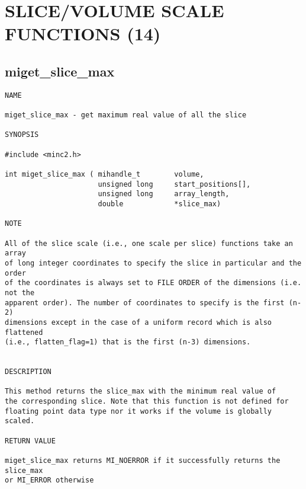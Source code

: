 \documentclass{article}
\begin{document}
\section{SLICE/VOLUME SCALE FUNCTIONS (14)}
\subsection{miget\_slice\_max}
\begin{verbatim}
NAME 

miget_slice_max - get maximum real value of all the slice

SYNOPSIS

#include <minc2.h>

int miget_slice_max ( mihandle_t        volume,
                      unsigned long     start_positions[],
                      unsigned long     array_length,
                      double            *slice_max)
                       
NOTE

All of the slice scale (i.e., one scale per slice) functions take an array
of long integer coordinates to specify the slice in particular and the order 
of the coordinates is always set to FILE ORDER of the dimensions (i.e. not the
apparent order). The number of coordinates to specify is the first (n-2) 
dimensions except in the case of a uniform record which is also flattened
(i.e., flatten_flag=1) that is the first (n-3) dimensions.                                


DESCRIPTION

This method returns the slice_max with the minimum real value of
the corresponding slice. Note that this function is not defined for
floating point data type nor it works if the volume is globally scaled.

RETURN VALUE

miget_slice_max returns MI_NOERROR if it successfully returns the slice_max
or MI_ERROR otherwise
\end{verbatim}
\end{document}
